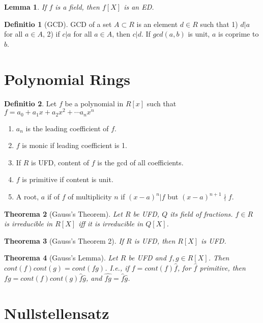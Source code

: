 \documentclass[12pt, a4paper]{article}
\newtheorem{theorem}{Theorema}
\newtheorem{lemma}[theorem]{Lemma}
\theoremstyle{definition}
\newtheorem{definition}{Definitio}
\theoremstyle{remark}
\begin{document}
\begin{lemma}
	If $f$ is a field, then $f[X]$ is an ED.
\end{lemma}

\begin{definition}[GCD]
	GCD of a set $A \subset R$ is an element $d \in R$ such that 1) $d | a$ for all $a \in A$, 2) if $c | a$ for all $a \in A$, then $c | d$.
	If $gcd(a, b)$ is unit, $a$ is coprime to $b$.
\end{definition}

\section{Polynomial Rings}
\begin{definition}
	Let $f$ be a polynomial in $R[x]$ such that $f = a_0 + a_1x + a_2x^2 + \cdots a_n x^n$
	\begin{enumerate}
		\item $a_n$ is the leading coefficient of $f$.
		\item $f$ is monic if leading coefficient is 1.
		\item If $R$ is UFD, content of $f$ is the gcd of all coefficients.
		\item $f$ is primitive if content is unit.
		\item A root, $a$ if of $f$ of multiplicity $n$ if $(x-a)^n | f$ but $(x-a)^{n+1} \nmid f$.
	\end{enumerate}
\end{definition}

\begin{theorem}[Gauss's Theorem]
	Let $R$ be UFD, $Q$ its field of fractions. 
	$f \in R$ is irreducible in $R[X]$ iff it is irreducible in $Q[X]$.
\end{theorem}

\begin{theorem}[Gauss's Theorem 2]
	If $R$ is UFD, then $R[X]$ is UFD.
\end{theorem}

\begin{theorem}[Gauss's Lemma]
	Let $R$ be UFD and $f, g \in R[X]$.
	Then $cont(f)cont(g)=cont(fg)$.
	I.e., if $f = cont(f)\widehat{f}$, for $\widehat{f}$ primitive, then $fg = cont(f)cont(g)\widehat{f}\widehat{g}$, and $\widehat{fg} = \widehat{f}\widehat{g}$.
\end{theorem}

\section{Nullstellensatz}
\end{document}
